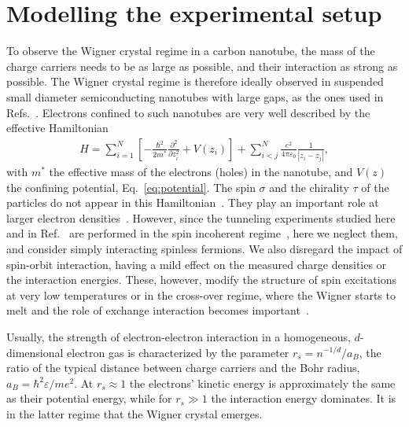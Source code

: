 \documentclass[aps, prb, floatfix, twocolumn, notitlepage, superscriptaddress, 10pt]{revtex4-2}
\newcommand{\n}{N}
\newcommand{\1}{{1\hspace*{-0.5ex} \textrm{l} \hspace*{0.5ex}}}
\begin{document}

\section{Modelling the experimental setup}\label{sec:experiment}
\label{sec:modeling} 

To observe the Wigner crystal regime in a carbon nanotube, the mass  of the charge carriers 
needs to be as large as possible, and their interaction as strong as possible. The
Wigner crystal regime is therefore ideally observed in suspended small diameter semiconducting 
nanotubes with large gaps, as the ones used in Refs.~\cite{Shapir.2019,Deshpande.2008}. 
Electrons  confined to  such nanotubes are  very well described by the effective  Hamiltonian 
\begin{gather}\label{eq:Hamiltonian_1}
H = \sum_{i = 1}^\n \left[ -\frac{\hbar^2}{2m^*}\frac{\partial^2}{\partial z_i^2} + V(z_i) \right] + \sum_{i<j}^\n \frac{e^2}{4 \pi \varepsilon_0}\frac{1}{\left| z_i - z_j  \right|},
\end{gather}
with $m^*$ the effective mass of the electrons (holes) in the nanotube, and $V(z)$ the confining potential, Eq.~\eqref{eq:potential}.
The spin $\sigma$ and the chirality $\tau$ of the particles do not appear  in this Hamiltonian~\cite{Charlier.2007}. 
They play an important role at larger electron densities~\cite{Sarkany.2017}. 
 However, since  the tunneling experiments studied here and in Ref.~\cite{Shapir.2019} are 
performed in the spin incoherent regime~\cite{Fiete2007}, here we  neglect them, and 
consider simply interacting spinless fermions. 
We also disregard the impact of spin-orbit interaction,  having 
a mild effect on the measured charge densities or the interaction energies. These, however, 
modify the structure of  spin excitations at very low temperatures or in the cross-over 
regime, where the Wigner starts to melt and the role of exchange interaction becomes 
important~\cite{Sarkany.2017}. 



Usually, the strength of electron-electron interaction  in a homogeneous, $d$-dimensional electron gas
is characterized by the parameter $r_s=n^{-1/d}/a_B$,   the ratio of the typical distance between charge 
carriers and the Bohr radius,  $a_B = \hbar^2 \varepsilon/me^2$. At $r_s\approx 1$
the electrons' kinetic energy is approximately the same as their potential energy, while for $r_s\gg 1$ the 
interaction energy dominates. It is in the latter regime that the Wigner crystal emerges. 
\end{document}
